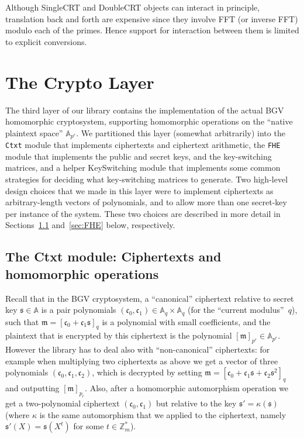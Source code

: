 \documentclass[14pt]{extarticle}
\newcommand{\A}{\mathbb{A}}
\newcommand{\Z}{\mathbb{Z}}
\def\SingleCRT{\textsf{SingleCRT}}
\def\DoubleCRT{\textsf{DoubleCRT}}
\def\Ctxt{\textsf{Ctxt}}
\def\KeySwitching{\textsf{KeySwitching}}
\newcommand{\ct}{\mathfrak{c}}
\newcommand{\mm}{\mathfrak{m}}
\newcommand{\sk}{\mathfrak{s}}
\begin{document}
Although {\SingleCRT} and {\DoubleCRT} objects can interact in
principle, translation back and forth are expensive since they involve
FFT (or inverse FFT) modulo each of the primes. Hence support for
interaction between them is limited to explicit conversions.

\section{The Crypto Layer} \label{sec:crypto}
The third layer of our library contains the implementation of the
actual BGV homomorphic cryptosystem, supporting homomorphic operations
on the ``native plaintext space'' $\A_{p^r}$. We
partitioned this layer (somewhat arbitrarily) into the \texttt{Ctxt}
module that implements ciphertexts and ciphertext arithmetic, the
\texttt{FHE} module that implements the public and secret keys, and
the key-switching matrices, and a helper {\KeySwitching} module that
implements some common strategies for deciding what key-switching
matrices to generate. Two high-level design
choices that we made in this layer were to implement ciphertexts as
arbitrary-length vectors of polynomials, and to allow more than one
secret-key per instance of the system. These two choices are described
in more detail in Sections~\ref{sec:Ctxt} and~\ref{sec:FHE} below,
respectively.

\subsection{The {\Ctxt} module: Ciphertexts and homomorphic operations}
\label{sec:Ctxt}
Recall that in the BGV cryptosystem, a ``canonical'' ciphertext
relative to secret key $\sk\in\A$ is a pair polynomials
$(\ct_0,\ct_1)\in \A_q \times \A_q$ (for the ``current modulus''~$q$), such
that $\mm=[\ct_0+\ct_1\sk]_q$ is a polynomial with small coefficients,
and the plaintext that is encrypted by this ciphertext is the
polynomial $[\mm]_{p^r}\in\A_{p^r}$. However the library has to deal also
with ``non-canonical'' ciphertexts: for example when multiplying two
ciphertexts as above we get a vector of three polynomials $(\ct_0,
\ct_1,\ct_2)$, which is decrypted by setting $\mm=[\ct_0+\ct_1\sk
+\ct_2\sk^2]_q$ and outputting $[\mm]_{p_r}$. Also, after a homomorphic
automorphism operation we get a two-polynomial ciphertext $(\ct_0,
\ct_1)$ but relative to the key $\sk'=\kappa(\sk)$ (where $\kappa$
is the same automorphism that we applied to the ciphertext, namely
$\sk'(X)=\sk(X^t)$ for some $t\in\Z_m^*$).
\end{document}
